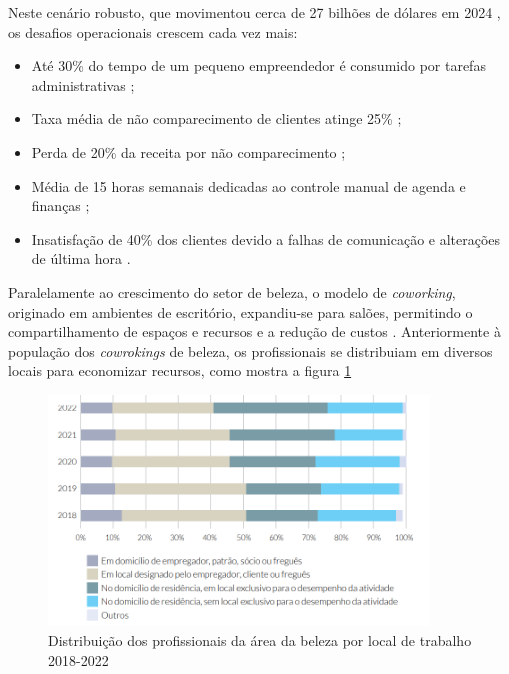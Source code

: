 \FloatBarrier

Neste cenário robusto, que movimentou cerca de 27 bilhões de dólares em 2024 \cite{ecommercenapratica2025}, os desafios operacionais crescem cada vez mais: 

\begin{itemize}
	\item Até 30\% do tempo de um pequeno empreendedor é consumido por tarefas administrativas \cite{senac2022};
	\item Taxa média de não comparecimento de clientes atinge 25\% \cite{booksy2022};
	\item Perda de 20\% da receita por não comparecimento \cite{abihpec2021};
	\item Média de 15 horas semanais dedicadas ao controle manual de agenda e finanças \cite{fgv2020};
	\item Insatisfação de 40\% dos clientes devido a falhas de comunicação e alterações de última hora \cite{mindminers2022}.
\end{itemize}

Paralelamente ao crescimento do setor de beleza, o modelo de \emph{coworking}, originado em ambientes de escritório, expandiu-se para salões, permitindo o compartilhamento de espaços e recursos e a redução de custos \cite{sebrae_coworking,sebraesc2025}. Anteriormente à população dos \emph{cowrokings} de beleza, os profissionais se distribuiam em diversos locais para economizar recursos, como mostra a figura \ref{fig:Distribuição_locais}

\begin{figure}[htb]
	\centering
	\includegraphics[width=0.9\textwidth]{cap01-Introducao/Images/1.3_local_trabalho_profissionais}
	\caption{Distribuição dos profissionais da área da beleza por local de trabalho 2018-2022}
	\label{fig:Distribuição_locais}
\end{figure}

